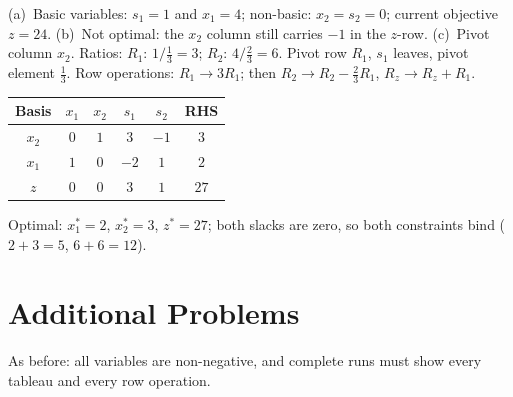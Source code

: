 \begin{solutions}
  \item (a)~Basic variables: $s_1=1$ and $x_1=4$; non-basic:
        $x_2=s_2=0$; current objective $z=24$. (b)~Not optimal: the
        $x_2$ column still carries $-1$ in the $z$-row. (c)~Pivot column
        $x_2$. Ratios: $R_1$: $1\big/\tfrac{1}{3}=3$; $R_2$:
        $4\big/\tfrac{2}{3}=6$. Pivot row $R_1$, $s_1$ leaves, pivot
        element $\tfrac{1}{3}$. Row operations: $R_1\to 3R_1$; then
        $R_2\to R_2-\tfrac{2}{3}R_1$, $R_z\to R_z+R_1$.
        \begin{center}
        \begin{tabular}{c|cccc|c}
        Basis & $x_1$ & $x_2$ & $s_1$ & $s_2$ & RHS\\
        \hline
        $x_2$ & $0$ & $1$ & $3$ & $-1$ & $3$\\
        $x_1$ & $1$ & $0$ & $-2$ & $1$ & $2$\\
        \hline
        $z$ & $0$ & $0$ & $3$ & $1$ & $27$\\
        \end{tabular}
        \end{center}
        Optimal: $x_1^{*}=2$, $x_2^{*}=3$, $z^{*}=27$; both slacks are
        zero, so both constraints bind ($2+3=5$, $6+6=12$).
\end{solutions}

\section{Additional Problems}

As before: all variables are non-negative, and complete runs must show
every tableau and every row operation.

